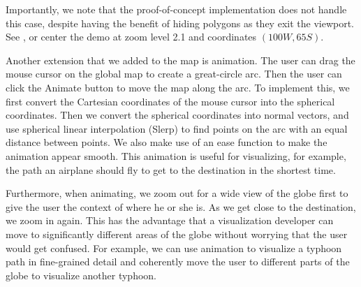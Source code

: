 Importantly, we note that the proof-of-concept implementation does not handle
  this case, despite having the benefit of hiding polygons as they exit the
  viewport.
See , or center the demo at zoom level 2.1 and coordinates
  $(100W, 65S)$.



Another extension that we added to the map is animation. The user can drag the mouse cursor on the global map to create a great-circle arc. Then the user can click the Animate button to move the map along the arc. To implement this, we first convert the Cartesian coordinates of the mouse cursor into the spherical coordinates. Then we convert the spherical coordinates into normal vectors, and use spherical linear interpolation (Slerp) to find points on the arc with an equal distance between points. We also make use of an ease function to make the animation appear smooth. This animation is useful for visualizing, for example, the path an airplane should fly to get to the destination in the shortest time.

Furthermore, when animating, we zoom out for a wide view of the globe first to give the user the context of where he or she is. As we get close to the destination, we zoom in again. This has the advantage that a visualization developer can move to significantly different areas of the globe without worrying that the user would get confused. For example, we can use animation to visualize a typhoon path in fine-grained detail and coherently move the user to different parts of the globe to visualize another typhoon.
